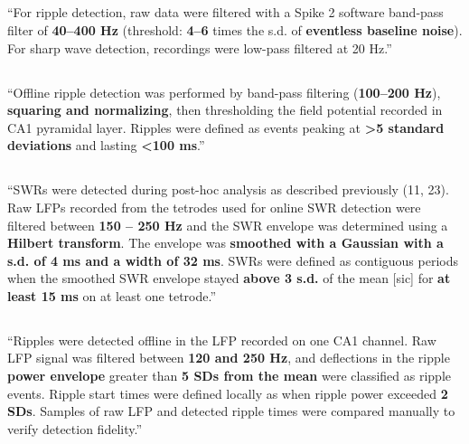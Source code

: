 \subsection{}

``For ripple detection, raw data were filtered with a Spike 2 software band-pass filter of \textbf{40--400 Hz} (threshold: \textbf{4--6} times the s.d. of \textbf{eventless baseline noise}). For sharp wave detection, recordings were low-pass filtered at 20 Hz.'' \cite{Behrens2005}


\subsection{}

``Offline ripple detection was performed by band-pass filtering (\textbf{100--200 Hz}), \textbf{squaring and normalizing}, then thresholding the field potential recorded in CA1 pyramidal layer. Ripples were defined as events peaking at \textbf{>5 standard deviations} and lasting \textbf{<100 ms}.'' \cite{Girardeau2009}


\subsection{}

``SWRs were detected during post-hoc analysis as described previously (11, 23). Raw LFPs recorded from the tetrodes used for online SWR detection were filtered between \textbf{150 – 250 Hz} and the SWR envelope was determined using a \textbf{Hilbert transform}. The envelope was \textbf{smoothed with a Gaussian with a s.d. of 4 ms and a width of 32 ms}. SWRs were defined as contiguous periods when the smoothed SWR envelope stayed \textbf{above 3 s.d.} of the mean [sic] for \textbf{at least 15 ms} on at least one tetrode.'' \cite{Jadhav2012}


\subsection{}

``Ripples were detected offline in the LFP recorded on one CA1 channel. Raw LFP signal was filtered between \textbf{120 and 250 Hz}, and deflections in the ripple \textbf{power envelope} greater than \textbf{5 SDs from the mean} were classified as ripple events. Ripple start times were defined locally as when ripple power exceeded \textbf{2 SDs}. Samples of raw LFP and detected ripple times were compared manually to verify detection fidelity.'' \cite{Sadowski2016}


